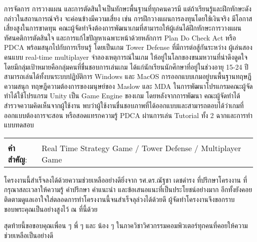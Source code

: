\documentclass[12pt,oneside,openright,a4paper]{cpe-thai-project}
\begin{document}
การจัดการ การวางแผน และการตัดสินใจเป็นทักษะพื้นฐานที่ทุกคนควรมี 
แต่ถ้าเรียนรู้และฝึกทักษะดังกล่าวในสถานการณ์จริง จะค่อนข้างมีความเสี่ยง เช่น 
การฝึกวางแผนการลงทุนโดยใช้เงินจริง มีโอกาสเสี่ยงสูงในการขาดทุน 
คณะผู้จัดทำจึงต้องการพัฒนาเกมที่สามารถให้ผู้เล่นได้ฝึกทักษะการวางแผน 
ทัศนคติการตัดสินใจ และการแก้ไขปัญหาเฉพาะหน้าด้วยหลักการ Plan Do Check Act หรือ PDCA  
พร้อมสนุกไปกับการเรียนรู้ โดยเป็นเกม Tower Defense ที่มีการต่อสู้กันระหว่าง
ผู้เล่นสองคนแบบ real-time multiplayer จำลองเหตุการณ์ในเกม
ให้อยู่ในโลกของขนมหวานที่น่าดึงดูดใจ โดยมีกลุ่มเป้าหมายคือกลุ่มคนที่ชื่นชอบการเล่นเกม 
ได้แก่นักเรียนนักศึกษาที่อยู่ในช่วงอายุ 15-24 ปี 
สามารถเล่นได้ทั้งบนระบบปฏิบัติการ Windows และ MacOS 
การออกแบบเกมอยู่บนพื้นฐานทฤษฎีความสนุก ทฤษฎีความต้องการของมนุษย์ของ Maslow 
และ MDA ในการพัฒนาโปรแกรมคณะผู้จัดทำได้ใช้โปรแกรม Unity เป็น Game Engine ของเกม 
โดยหลังจากการพัฒนา คณะผู้จัดทำได้สำรวจความคิดเห็นจากผู้ใช้งาน 
พบว่าผู้ใช้งานชื่นชอบภาพที่ได้ออกแบบและสามารถตอบได้ว่าเกมที่ออกแบบต้องการจะสอน
หรือสอดแทรกความรู้ PDCA ผ่านการเล่น Tutorial ทั้ง 2 ฉากและการทำแบบทดสอบ


\begin{flushleft}
\begin{tabular*}{\textwidth}{@{}lp{}}
 & \\

\textbf{คำสำคัญ}: & Real Time Strategy Game / Tower Defense / Multiplayer Game
\end{tabular*}
\end{flushleft}
\endabstract



\preface
โครงงานนี้สำเร็จลงได้ด้วยความช่วยเหลืออย่างดียิ่งจาก รศ.ดร.ณัฐชา เดชดำรง ที่ปรึกษาโครงงาน 
ที่กรุณาสละเวลาให้ความรู้ คำปรึกษา คำแนะนำ และข้อเสนอแนะที่เป็นประโยชน์อย่างมาก 
อีกทั้งยังคอยติดตามดูแลเอาใจใส่ตลอดการทำโครงงานนี้จนสำเร็จลุล่วงได้ด้วยดี 
ผู้จัดทำโครงงานจึงขอกราบขอบพระคุณเป็นอย่างสูงไว้ ณ ที่นี้ด้วย

สุดท้ายนี้ขอขอบคุณเพื่อน ๆ พี่ ๆ และ น้อง ๆ ในภาควิชาวิศวกรรมคอมพิวเตอร์ทุกคนที่คอยให้ความช่วยเหลือเป็นอย่างดี


\tableofcontents                    
\listoftables
\listoffigures                      
\end{document}
